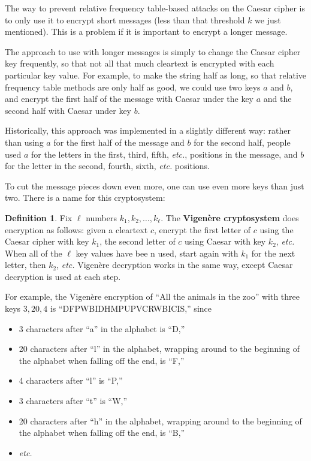 \documentclass[12pt,letterpaper]{amsbook}
\theoremstyle{definition}
\newtheorem{definition}[theorem]{Definition}
\theoremstyle{remark}
\numberwithin{figure}{section}
\numberwithin{exercise}{chapter}
\numberwithin{section}{chapter}
\numberwithin{equation}{section}
\numberwithin{table}{subsection}
\begin{document}
The way to prevent relative frequency table-based attacks on the Caesar cipher
is to only use it to encrypt short messages (less than that threshold $k$ we
just mentioned).  This is a problem if it is important to encrypt a longer
message.

The approach to use with longer messages is simply to change the Caesar cipher
key frequently, so that not all that much cleartext is encrypted with each
particular key value.  For example, to make the string half as long, so that
relative frequency table methods are only half as good, we could use two keys
$a$ and $b$, and encrypt the first half of the message with Caesar under the
key $a$ and the second half with Caesar under key $b$.

Historically, this approach was implemented in a slightly different way: rather
than using $a$ for the first half of the message and $b$ for the second half,
people used $a$ for the letters in the first, third, fifth, \textit{etc.},
positions in the message, and $b$ for the letter in the second, fourth, sixth,
\textit{etc.} positions.

To cut the message pieces down even more, one can use even more keys than just
two.  There is a name for this cryptosystem:
\begin{definition}\label{def:vigenere}
Fix $\ell$ numbers $k_1,k_2,\dots,k_\ell$.  The \textbf{Vigen\`ere cryptosystem}
does encryption as follows: given a cleartext $c$, encrypt the first letter
of $c$ using the Caesar cipher with key $k_1$, the second letter of $c$ using
Caesar with key $k_2$, \textit{etc.}  When all of the $\ell$ key values have
bee n used, start again with $k_1$ for the next letter, then
$k_2$, \textit{etc.}  Vigen\`ere decryption works in the same way, except
Caesar decryption is used at each step.
\end{definition}

For example, the Vigen\`ere encryption of ``All the animals in the zoo'' with
three keys $3, 20, 4$ is ``DFPWBIDHMPUPVCRWBICIS,'' since
\begin{itemize}
\item[$\bullet$] 3 characters after ``a'' in the alphabet is ``D,''
\item[$\bullet$] 20 characters after ``l'' in the alphabet, wrapping around to
the beginning of the alphabet when falling off the end, is ``F,''
\item[$\bullet$] 4 characters after ``l'' is ``P,''
\item[$\bullet$] 3 characters after ``t'' is ``W,''
\item[$\bullet$] 20 characters after ``h'' in the alphabet, wrapping around to
the beginning of the alphabet when falling off the end, is ``B,''
\item[$\bullet$]  \textit{etc.}
\end{itemize}
\end{document}
